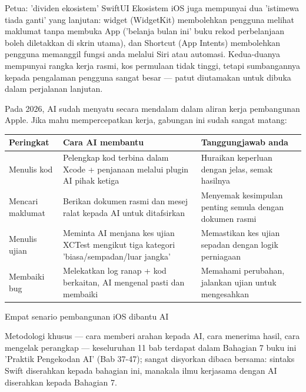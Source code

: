 \begin{tcbinfo}{Petua: 'dividen ekosistem' SwiftUI}
Ekosistem iOS juga mempunyai dua 'istimewa tiada ganti' yang lanjutan: widget (WidgetKit) membolehkan pengguna melihat maklumat tanpa membuka App ('belanja bulan ini' buku rekod perbelanjaan boleh diletakkan di skrin utama), dan Shortcut (App Intents) membolehkan pengguna memanggil fungsi anda melalui Siri atau automasi. Kedua-duanya mempunyai rangka kerja rasmi, kos permulaan tidak tinggi, tetapi sumbangannya kepada pengalaman pengguna sangat besar — patut diutamakan untuk dibuka dalam perjalanan lanjutan.

\end{tcbinfo}


Pada 2026, AI sudah menyatu secara mendalam dalam aliran kerja pembangunan Apple. Jika mahu mempercepatkan kerja, gabungan ini sudah sangat matang:

\begin{center}
\begin{tabularx}{\linewidth}{|X|X|X|}
\hline
\textbf{Peringkat} & \textbf{Cara AI membantu} & \textbf{Tanggungjawab anda} \tabularnewline
\hline
Menulis kod & Pelengkap kod terbina dalam Xcode + penjanaan melalui plugin AI pihak ketiga & Huraikan keperluan dengan jelas, semak hasilnya \tabularnewline
Mencari maklumat & Berikan dokumen rasmi dan mesej ralat kepada AI untuk ditafsirkan & Menyemak kesimpulan penting semula dengan dokumen rasmi \tabularnewline
Menulis ujian & Meminta AI menjana kes ujian XCTest mengikut tiga kategori 'biasa/sempadan/luar jangka' & Memastikan kes ujian sepadan dengan logik perniagaan \tabularnewline
Membaiki bug & Melekatkan log ranap + kod berkaitan, AI mengenal pasti dan membaiki & Memahami perubahan, jalankan ujian untuk mengesahkan \tabularnewline
\hline
\end{tabularx}
\end{center}

\begin{center}\small\color{gray}Empat senario pembangunan iOS dibantu AI\end{center}

Metodologi khusus — cara memberi arahan kepada AI, cara menerima hasil, cara mengelak perangkap — keseluruhan 11 bab terdapat dalam Bahagian 7 buku ini 'Praktik Pengekodan AI' (Bab 37-47); sangat disyorkan dibaca bersama: sintaks Swift diserahkan kepada bahagian ini, manakala ilmu kerjasama dengan AI diserahkan kepada Bahagian 7.

